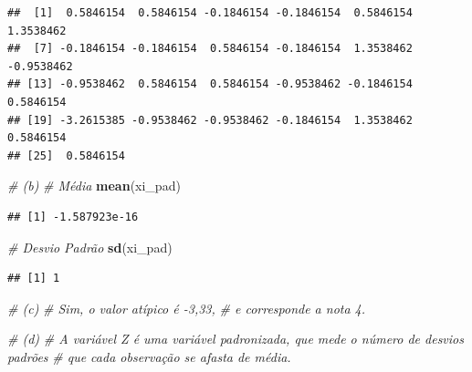 \documentclass[]{article}
\newenvironment{Shaded}{\begin{snugshade}}{\end{snugshade}}
\newcommand{\KeywordTok}[1]{\textcolor[rgb]{0.13,0.29,0.53}{\textbf{#1}}}
\newcommand{\CommentTok}[1]{\textcolor[rgb]{0.56,0.35,0.01}{\textit{#1}}}
\newcommand{\NormalTok}[1]{#1}
\begin{document}
\begin{verbatim}
##  [1]  0.5846154  0.5846154 -0.1846154 -0.1846154  0.5846154  1.3538462
##  [7] -0.1846154 -0.1846154  0.5846154 -0.1846154  1.3538462 -0.9538462
## [13] -0.9538462  0.5846154  0.5846154 -0.9538462 -0.1846154  0.5846154
## [19] -3.2615385 -0.9538462 -0.9538462 -0.1846154  1.3538462  0.5846154
## [25]  0.5846154
\end{verbatim}

\begin{Shaded}
\begin{Highlighting}[]
\CommentTok{# (b)}
\CommentTok{# Média}
\KeywordTok{mean}\NormalTok{(xi_pad)}
\end{Highlighting}
\end{Shaded}

\begin{verbatim}
## [1] -1.587923e-16
\end{verbatim}

\begin{Shaded}
\begin{Highlighting}[]
\CommentTok{# Desvio Padrão}
\KeywordTok{sd}\NormalTok{(xi_pad)}
\end{Highlighting}
\end{Shaded}

\begin{verbatim}
## [1] 1
\end{verbatim}

\begin{Shaded}
\begin{Highlighting}[]
\CommentTok{# (c)}
\CommentTok{# Sim, o valor atípico é -3,33,}
\CommentTok{# e corresponde a nota 4.}

\CommentTok{# (d)}
\CommentTok{# A variável Z é uma variável padronizada, que mede o número de desvios padrões}
\CommentTok{# que cada observação se afasta de média.}
\end{Highlighting}
\end{Shaded}
\end{document}

